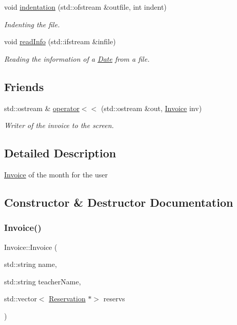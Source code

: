 \begin{DoxyCompactItemize}
$$void \mbox{\hyperlink{class_invoice_a08ce5090cf11e9f74820810d3796dea2}{indentation}} (std\+::ofstream \&outfile, int indent)
\begin{DoxyCompactList}\small\item\em Indenting the file. \end{DoxyCompactList}\item 
void \mbox{\hyperlink{class_invoice_aae19e485510f08c56be425b4634246ed}{read\+Info}} (std\+::ifstream \&infile)
\begin{DoxyCompactList}\small\item\em Reading the information of a \mbox{\hyperlink{class_date}{Date}} from a file. \end{DoxyCompactList}\end{DoxyCompactItemize}
\subsection*{Friends}
\begin{DoxyCompactItemize}
\item 
std\+::ostream \& \mbox{\hyperlink{class_invoice_a1ff3da2cc7abd9df37b2936772ce9ff7}{operator$<$$<$}} (std\+::ostream \&out, \mbox{\hyperlink{class_invoice}{Invoice}} inv)
\begin{DoxyCompactList}\small\item\em Writer of the invoice to the screen. \end{DoxyCompactList}\end{DoxyCompactItemize}


\subsection{Detailed Description}
\mbox{\hyperlink{class_invoice}{Invoice}} of the month for the user 

\subsection{Constructor \& Destructor Documentation}
\mbox{\label{class_invoice_a332d51ff2cf16d52178fa61ddc69f017}} 
\subsubsection{\texorpdfstring{Invoice()}{Invoice()}}
{\footnotesize\ttfamily Invoice\+::\+Invoice (\begin{DoxyParamCaption}\item[{std\+::string}]{name,  }\item[{std\+::string}]{teacher\+Name,  }\item[{std\+::vector$<$ \mbox{\hyperlink{class_reservation}{Reservation}} $\ast$$>$}]{reservs }\end{DoxyParamCaption})}



